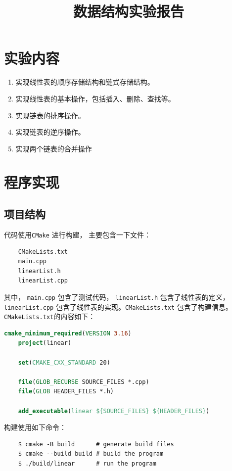 \documentclass{csexp}
\begin{document}
\title{数据结构实验报告}


\makecover

\section{实验内容}


\begin{enumerate}
    \item 实现线性表的顺序存储结构和链式存储结构。
    \item 实现线性表的基本操作，包括插入、删除、查找等。
    \item 实现链表的排序操作。
    \item 实现链表的逆序操作。
    \item 实现两个链表的合并操作
\end{enumerate}

\section{程序实现}

\subsection{项目结构}

代码使用\texttt{CMake} 进行构建， 主要包含一下文件：
\begin{verbatim}
    CMakeLists.txt
    main.cpp
    linearList.h
    linearList.cpp
\end{verbatim}

其中， \texttt{main.cpp} 包含了测试代码， \texttt{linearList.h} 包含了线性表的定义， \texttt{linearList.cpp} 包含了线性表的实现。\texttt{CMakeLists.txt} 包含了构建信息。\texttt{CMakeLists.txt}的内容如下：

\begin{lstlisting}[language=CMake]
    cmake_minimum_required(VERSION 3.16)
    project(linear)

    set(CMAKE_CXX_STANDARD 20)

    file(GLOB_RECURSE SOURCE_FILES *.cpp)
    file(GLOB HEADER_FILES *.h)

    add_executable(linear ${SOURCE_FILES} ${HEADER_FILES})
\end{lstlisting}

构建使用如下命令：
\begin{verbatim}
    $ cmake -B build      # generate build files
    $ cmake --build build # build the program
    $ ./build/linear      # run the program
\end{verbatim}
\end{document}

